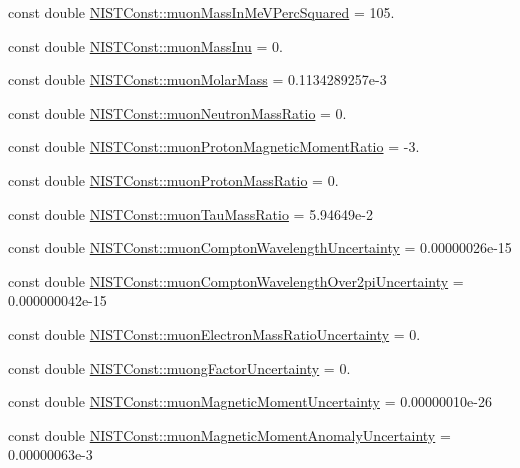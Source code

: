 \begin{DoxyCompactItemize}
\item 
const double \hyperlink{group___n_i_s_t_const-_muon_ga781e348a83468d065630fd1b6da85eab}{N\+I\+S\+T\+Const\+::muon\+Mass\+In\+Me\+V\+Perc\+Squared} = 105.
\item 
const double \hyperlink{group___n_i_s_t_const-_muon_gaa24722892f878b56a8aa97cca27ed908}{N\+I\+S\+T\+Const\+::muon\+Mass\+Inu} = 0.
\item 
const double \hyperlink{group___n_i_s_t_const-_muon_ga9211251167ca5318354df60b44939e60}{N\+I\+S\+T\+Const\+::muon\+Molar\+Mass} = 0.\+1134289257e-\/3
\item 
const double \hyperlink{group___n_i_s_t_const-_muon_ga8f63813d3e0283a611f3e66b6d0b681d}{N\+I\+S\+T\+Const\+::muon\+Neutron\+Mass\+Ratio} = 0.
\item 
const double \hyperlink{group___n_i_s_t_const-_muon_gae49d53271e3ee71dc74d718028782d06}{N\+I\+S\+T\+Const\+::muon\+Proton\+Magnetic\+Moment\+Ratio} = -\/3.
\item 
const double \hyperlink{group___n_i_s_t_const-_muon_ga72ca5408215ae40bb36ef1bff9107cf7}{N\+I\+S\+T\+Const\+::muon\+Proton\+Mass\+Ratio} = 0.
\item 
const double \hyperlink{group___n_i_s_t_const-_muon_gaaf24aa0c43f6d4a1935963fdd4c44789}{N\+I\+S\+T\+Const\+::muon\+Tau\+Mass\+Ratio} = 5.\+94649e-\/2
\item 
const double \hyperlink{group___n_i_s_t_const-_muon_gae48b3636db6004dfce70688e14d5ec59}{N\+I\+S\+T\+Const\+::muon\+Compton\+Wavelength\+Uncertainty} = 0.\+00000026e-\/15
\item 
const double \hyperlink{group___n_i_s_t_const-_muon_ga7327c823c40a8b0d6f6f5ecfbdb52b68}{N\+I\+S\+T\+Const\+::muon\+Compton\+Wavelength\+Over2pi\+Uncertainty} = 0.\+000000042e-\/15
\item 
const double \hyperlink{group___n_i_s_t_const-_muon_gaa73904af881586f3175bff51bcb130ff}{N\+I\+S\+T\+Const\+::muon\+Electron\+Mass\+Ratio\+Uncertainty} = 0.
\item 
const double \hyperlink{group___n_i_s_t_const-_muon_gaf7efb5afb4641fedbcf2e7d0842eb301}{N\+I\+S\+T\+Const\+::muong\+Factor\+Uncertainty} = 0.
\item 
const double \hyperlink{group___n_i_s_t_const-_muon_ga1adea83a61f7ae21631c916328f5dd52}{N\+I\+S\+T\+Const\+::muon\+Magnetic\+Moment\+Uncertainty} = 0.\+00000010e-\/26
\item 
const double \hyperlink{group___n_i_s_t_const-_muon_ga91c2a0c6a14a87fb189ce001120b5eb0}{N\+I\+S\+T\+Const\+::muon\+Magnetic\+Moment\+Anomaly\+Uncertainty} = 0.\+00000063e-\/3

\end{DoxyCompactItemize}
